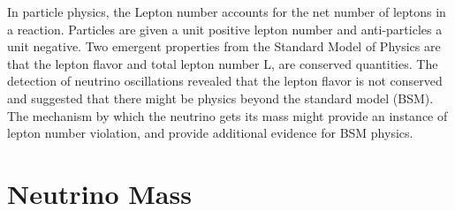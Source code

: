 


In particle physics, the Lepton number accounts for the net number of leptons in a reaction. Particles are given a unit positive lepton number and anti-particles a unit negative. Two emergent properties from the Standard Model of Physics are that the lepton flavor and total lepton number L, are conserved quantities. The detection of neutrino oscillations revealed that the lepton flavor is not conserved and suggested that there might be physics beyond the standard model (BSM). The mechanism by which the neutrino gets its mass might provide an instance of lepton number violation, and provide additional evidence for BSM physics.

\section{Neutrino Mass}

